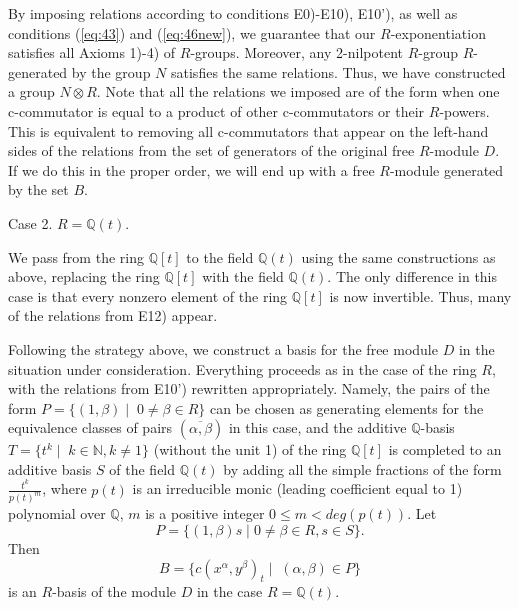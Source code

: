 \documentclass[11pt]{article}
\theoremstyle{definition}
\begin{document}
By imposing relations according to conditions E0)-E10), E10'), as well as conditions (\ref{eq:43}) and (\ref{eq:46new}), we guarantee that our $R$-exponentiation satisfies all Axioms 1)-4) of $R$-groups. Moreover, any 2-nilpotent $R$-group $R$-generated by the group $N$ satisfies the same relations. Thus, we have constructed a group $N \otimes R$. Note that all the relations we imposed are of the form when one c-commutator is equal to a product of other c-commutators or their $R$-powers. This is equivalent to removing all c-commutators that appear on the left-hand sides of the relations from the set of generators of the original free $R$-module $D$. If we do this in the proper order, we will end up with a free $R$-module generated by the set $B$. 

\medskip
\noindent
Case 2.  $R= \mathbb{Q}(t)$.

We pass from the ring $\mathbb{Q}[t]$ to the field $\mathbb{Q}(t)$ using the same constructions as above, replacing the ring $\mathbb{Q}[t]$ with the field $\mathbb{Q}(t)$. The only difference in this case is that every nonzero element of the ring $\mathbb{Q}[t]$ is now invertible. Thus, many of the relations from E12) appear.

Following the strategy above, we construct a basis for the free module $D$ in the situation under consideration. Everything proceeds as in the case of the ring $R$, with the relations from E10') rewritten appropriately. Namely, the pairs of the form $P=\{(1,\beta)\mid\;0\neq \beta\in R\}$ can be chosen as generating elements for the equivalence classes of pairs $(\overline{\alpha,\beta})$ in this case, and the additive $\mathbb{Q}$-basis $T=\{t^k\mid\;k\in\mathbb{N}, k \neq 1\}$ (without the unit 1) of the ring $\mathbb{Q}[t]$ is completed to an additive basis $S$ of the field $\mathbb{Q}(t)$ by adding all the simple fractions of the form $\frac{t^k}{p(t)^m}$, where $p(t)$ is an irreducible monic (leading coefficient equal to 1) polynomial over $\mathbb{Q}$, $m$ is a positive integer $0\leq m < deg(p(t))$.
Let
$$
P = \{(1,\beta)s \mid 0\neq \beta \in R, s \in S \}.
$$
Then
\begin{equation} \label{eq:baza-B-2t}
     B=\big\{c(x^\alpha,y^\beta)_t \mid\;(\alpha,\beta)\in P\big\}  \end{equation} 
    is an $R$-basis of the module $D$ in the case $R = \mathbb{Q}(t)$.
\end{document}
